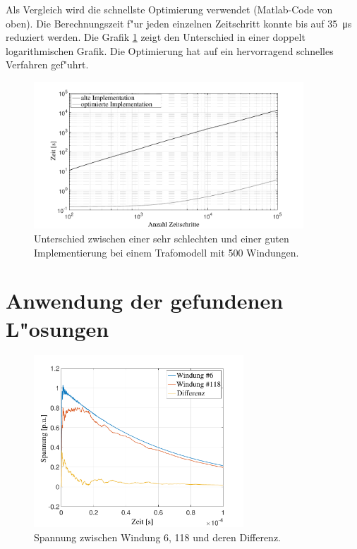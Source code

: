 \begin{refsection}
Als Vergleich wird die schnellste Optimierung verwendet (Matlab-Code von oben). Die Berechnungszeit f"ur jeden einzelnen Zeitschritt konnte bis auf \SI{35}{\micro \second} reduziert werden. Die Grafik \ref{trafo:Optimierung} zeigt den Unterschied in einer doppelt logarithmischen Grafik. Die Optimierung hat auf ein hervorragend schnelles Verfahren gef"uhrt.

\begin{figure}
	\centering
	\includegraphics[width=0.9\textwidth]{./trafo/images/differenceOptimization.pdf}
	\caption{Unterschied zwischen einer sehr schlechten und einer guten Implementierung bei einem Trafomodell mit 500 Windungen.}
	\label{trafo:Optimierung}
\end{figure}

\section{Anwendung der gefundenen L"osungen}

\begin{figure}
	\centering
	\includegraphics[width=0.7\textwidth]{./trafo/images/solution.pdf}
	\caption{Spannung zwischen Windung 6, 118 und deren Differenz.}
	\label{trafo:solution}
\end{figure}


\end{refsection}
